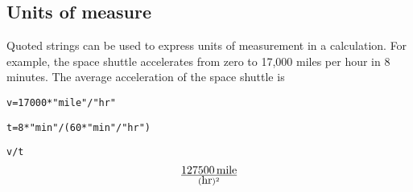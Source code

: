 \subsection{Units of measure}
Quoted strings can be used to express units of measurement in a calculation.
For example, the space shuttle accelerates from zero to
17{,}000 miles per hour in 8 minutes.
The average acceleration of the space shuttle is

\medskip
\verb$v=17000*"mile"/"hr"$

\verb$t=8*"min"/(60*"min"/"hr")$

\verb$v/t$
$$127500\,\hbox{mile}\over(\hbox{hr})^2$$

